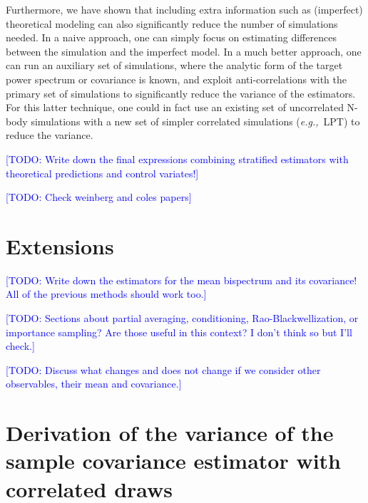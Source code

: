 \documentclass{aastex6}
\newcommand{\eg}{{\textit{e.g.,}~}}
\newcommand{\todo}[1]{\textcolor{blue}{[TODO: #1]}}
\begin{document}
Furthermore, we have shown that including extra information such as (imperfect) theoretical modeling can also significantly reduce the number of simulations needed. In a naive approach, one can simply focus on estimating differences between the simulation and the imperfect model. In a much better approach, one can run an auxiliary set of simulations, where the analytic form of the target power spectrum or covariance is known, and exploit anti-correlations with the primary set of simulations to significantly reduce the variance of the estimators.
For this latter technique, one could in fact use an existing set of uncorrelated N-body simulations with a new set of simpler correlated simulations (\eg  LPT) to reduce the variance.

\todo{Write down the final expressions combining stratified estimators with theoretical predictions and control variates!}

\todo{Check weinberg and coles papers}


\section{Extensions}

\todo{Write down the estimators for the mean bispectrum and its covariance! All of the previous methods should work too.}

\todo{Sections about partial averaging, conditioning, Rao-Blackwellization, or importance sampling? Are those useful in this context? I don't think so but I'll check.}

\todo{Discuss what changes and does not change if we consider other observables, their mean and covariance.}



\newpage
\appendix
\section{Derivation of the variance of the sample covariance estimator with correlated draws}\label{sec:samplecovariancecorrelateddraws}
\end{document}
